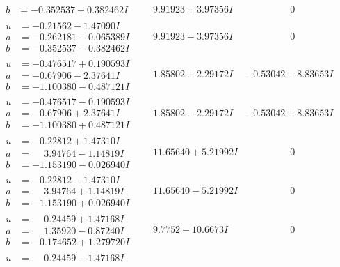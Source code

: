 \documentclass[1p]{elsarticle_modified}
\theoremstyle{definition}
\begin{document}
$$\begin{array}{c|c|c}
\begin{aligned}
b &= -0.352537 + 0.382462 I\end{aligned}
 & \phantom{-}9.91923 + 3.97356 I & \phantom{-0.000000 } 0 \\ \hline\begin{aligned}
u &= -0.21562 - 1.47090 I \\
a &= -0.262181 - 0.065389 I \\
b &= -0.352537 - 0.382462 I\end{aligned}
 & \phantom{-}9.91923 - 3.97356 I & \phantom{-0.000000 } 0 \\ \hline\begin{aligned}
u &= -0.476517 + 0.190593 I \\
a &= -0.67906 - 2.37641 I \\
b &= -1.100380 - 0.487121 I\end{aligned}
 & \phantom{-}1.85802 + 2.29172 I & -0.53042 - 8.83653 I \\ \hline\begin{aligned}
u &= -0.476517 - 0.190593 I \\
a &= -0.67906 + 2.37641 I \\
b &= -1.100380 + 0.487121 I\end{aligned}
 & \phantom{-}1.85802 - 2.29172 I & -0.53042 + 8.83653 I \\ \hline\begin{aligned}
u &= -0.22812 + 1.47310 I \\
a &= \phantom{-}3.94764 - 1.14819 I \\
b &= -1.153190 - 0.026940 I\end{aligned}
 & \phantom{-}11.65640 + 5.21992 I & \phantom{-0.000000 } 0 \\ \hline\begin{aligned}
u &= -0.22812 - 1.47310 I \\
a &= \phantom{-}3.94764 + 1.14819 I \\
b &= -1.153190 + 0.026940 I\end{aligned}
 & \phantom{-}11.65640 - 5.21992 I & \phantom{-0.000000 } 0 \\ \hline\begin{aligned}
u &= \phantom{-}0.24459 + 1.47168 I \\
a &= \phantom{-}1.35920 - 0.87240 I \\
b &= -0.174652 + 1.279720 I\end{aligned}
 & \phantom{-}9.7752 - 10.6673 I & \phantom{-0.000000 } 0 \\ \hline\begin{aligned}
u &= \phantom{-}0.24459 - 1.47168 I \\

\end{aligned}
\end{array}$$
\end{document}
